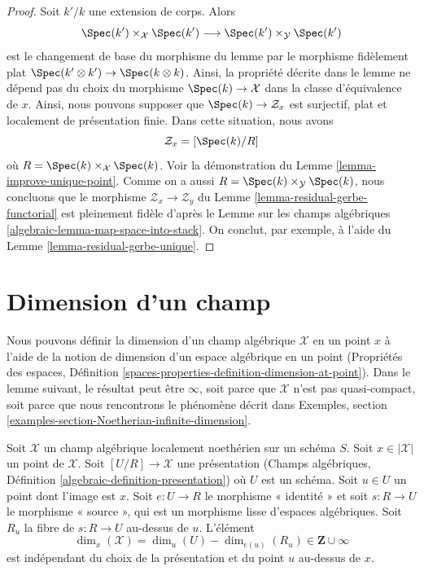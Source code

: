 \begin{proof}
Soit $k'/k$ une extension de corps. Alors
$$
\Spec(k') \times_\mathcal{X} \Spec(k')
\longrightarrow
\Spec(k') \times_\mathcal{Y} \Spec(k')
$$
est le changement de base du morphisme du lemme par le
morphisme fidèlement plat $\Spec(k' \otimes k') \to \Spec(k \otimes k)$.
Ainsi, la propriété décrite dans le lemme ne dépend pas du
choix du morphisme $\Spec(k) \to \mathcal{X}$ dans la
classe d'équivalence de $x$. Ainsi, nous pouvons supposer que
$\Spec(k) \to \mathcal{Z}_x$ est surjectif, plat et
localement de présentation finie. Dans cette situation, nous avons
$$
\mathcal{Z}_x = [\Spec(k)/R]
$$
où $R = \Spec(k) \times_\mathcal{X} \Spec(k)$. Voir la
démonstration du Lemme \ref{lemma-improve-unique-point}.
Comme on a aussi $R = \Spec(k) \times_\mathcal{Y} \Spec(k)$,
nous concluons que le morphisme $\mathcal{Z}_x \to \mathcal{Z}_y$
du Lemme \ref{lemma-residual-gerbe-functorial}
est pleinement fidèle d'après le
Lemme sur les champs algébriques \ref{algebraic-lemma-map-space-into-stack}.
On conclut, par exemple, à l'aide du Lemme \ref{lemma-residual-gerbe-unique}.
\end{proof}








\section{Dimension d'un champ}
\label{section-dimension}

\noindent
Nous pouvons définir la dimension d'un champ algébrique $\mathcal{X}$
en un point $x$ à l'aide de la notion de dimension d'un espace algébrique
en un point (Propriétés des espaces, Définition
\ref{spaces-properties-definition-dimension-at-point}).
Dans le lemme suivant, le résultat peut être $\infty$, soit parce que
$\mathcal{X}$ n'est pas quasi-compact, soit parce que nous rencontrons le
phénomène décrit dans Exemples, section
\ref{examples-section-Noetherian-infinite-dimension}.

\begin{lemma}
\label{lemma-dimension-at-point-well-defined}
Soit $\mathcal{X}$ un champ algébrique localement noethérien sur un schéma $S$.
Soit $x \in |\mathcal{X}|$ un point de $\mathcal{X}$.
Soit $[U/R] \to \mathcal{X}$ une présentation
(Champs algébriques, Définition \ref{algebraic-definition-presentation})
où $U$ est un schéma. Soit $u \in U$ un point dont l'image est $x$.
Soit $e : U \to R$ le morphisme « identité » et soit $s : R \to U$ le
morphisme « source », qui est un morphisme lisse d'espaces algébriques. Soit $R_u$
la fibre de $s : R \to U$ au-dessus de $u$. L'élément
$$
\dim_x(\mathcal{X}) = \dim_u(U) - \dim_{e(u)}(R_u) \in \mathbf{Z} \cup \infty
$$
est indépendant du choix de la présentation et du point $u$ au-dessus de $x$.
\end{lemma}

